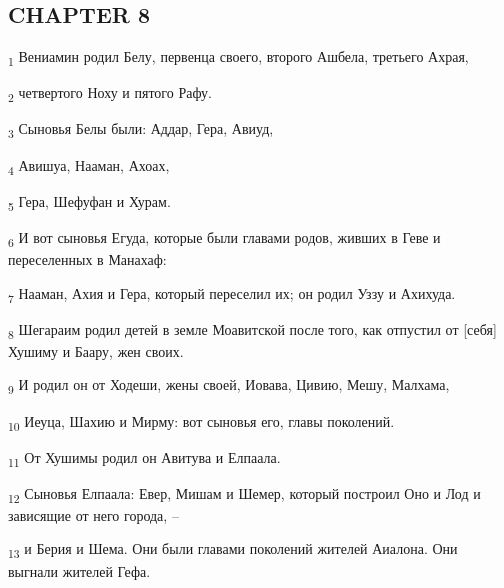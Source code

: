 \subsection{CHAPTER 8}
\begin{tcolorbox}
\textsubscript{1} Вениамин родил Белу, первенца своего, второго Ашбела, третьего Ахрая,
\end{tcolorbox}
\begin{tcolorbox}
\textsubscript{2} четвертого Ноху и пятого Рафу.
\end{tcolorbox}
\begin{tcolorbox}
\textsubscript{3} Сыновья Белы были: Аддар, Гера, Авиуд,
\end{tcolorbox}
\begin{tcolorbox}
\textsubscript{4} Авишуа, Нааман, Ахоах,
\end{tcolorbox}
\begin{tcolorbox}
\textsubscript{5} Гера, Шефуфан и Хурам.
\end{tcolorbox}
\begin{tcolorbox}
\textsubscript{6} И вот сыновья Егуда, которые были главами родов, живших в Геве и переселенных в Манахаф:
\end{tcolorbox}
\begin{tcolorbox}
\textsubscript{7} Нааман, Ахия и Гера, который переселил их; он родил Уззу и Ахихуда.
\end{tcolorbox}
\begin{tcolorbox}
\textsubscript{8} Шегараим родил детей в земле Моавитской после того, как отпустил от [себя] Хушиму и Баару, жен своих.
\end{tcolorbox}
\begin{tcolorbox}
\textsubscript{9} И родил он от Ходеши, жены своей, Иовава, Цивию, Мешу, Малхама,
\end{tcolorbox}
\begin{tcolorbox}
\textsubscript{10} Иеуца, Шахию и Мирму: вот сыновья его, главы поколений.
\end{tcolorbox}
\begin{tcolorbox}
\textsubscript{11} От Хушимы родил он Авитува и Елпаала.
\end{tcolorbox}
\begin{tcolorbox}
\textsubscript{12} Сыновья Елпаала: Евер, Мишам и Шемер, который построил Оно и Лод и зависящие от него города, --
\end{tcolorbox}
\begin{tcolorbox}
\textsubscript{13} и Берия и Шема. Они были главами поколений жителей Аиалона. Они выгнали жителей Гефа.
\end{tcolorbox}

